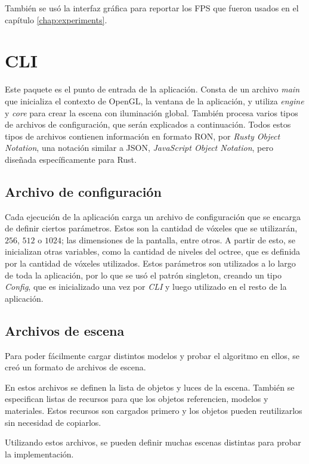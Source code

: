 También se usó la interfaz gráfica para reportar los FPS que fueron usados en el capítulo \ref{chap:experiments}.

\section{CLI}

Este paquete es el punto de entrada de la aplicación.
Consta de un archivo \textit{main} que inicializa el contexto de OpenGL, la ventana de la aplicación, y utiliza \textit{engine} y \textit{core} para crear la escena con iluminación global.
También procesa varios tipos de archivos de configuración, que serán explicados a continuación.
Todos estos tipos de archivos contienen información en formato RON, por \textit{Rusty Object Notation}, una notación similar a JSON, \textit{JavaScript Object Notation}, pero diseñada específicamente para Rust.

\subsection{Archivo de configuración}

Cada ejecución de la aplicación carga un archivo de configuración que se encarga de definir ciertos parámetros.
Estos son la cantidad de vóxeles que se utilizarán, $256$, $512$ o $1024$; las dimensiones de la pantalla, entre otros.
A partir de esto, se inicializan otras variables, como la cantidad de niveles del octree, que es definida por la cantidad de vóxeles utilizados.
Estos parámetros son utilizados a lo largo de toda la aplicación, por lo que se usó el patrón singleton, creando un tipo \textit{Config}, que es inicializado una vez por \textit{CLI} y luego utilizado en el resto de la aplicación.

\subsection{Archivos de escena}

Para poder fácilmente cargar distintos modelos y probar el algoritmo en ellos, se creó un formato de archivos de escena.

En estos archivos se definen la lista de objetos y luces de la escena.
También se especifican listas de recursos para que los objetos referencien, modelos y materiales.
Estos recursos son cargados primero y los objetos pueden reutilizarlos sin necesidad de copiarlos.

Utilizando estos archivos, se pueden definir muchas escenas distintas para probar la implementación.

